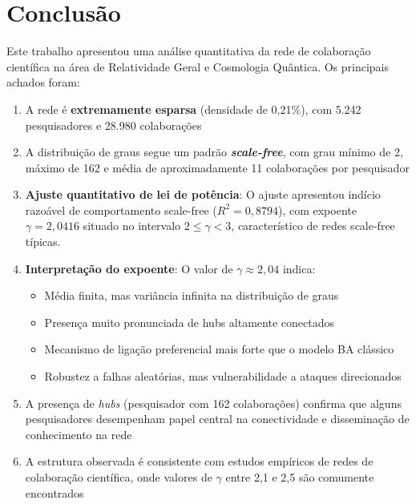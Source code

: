 \documentclass[12pt,a4paper]{article}
\begin{document}
\section{Conclusão}

Este trabalho apresentou uma análise quantitativa da rede de colaboração científica na área de Relatividade Geral e Cosmologia Quântica. Os principais achados foram:

\begin{enumerate}
    \item A rede é \textbf{extremamente esparsa} (densidade de 0,21\%), com 5.242 pesquisadores e 28.980 colaborações
    
    \item A distribuição de graus segue um padrão \textbf{\textit{scale-free}}, com grau mínimo de 2, máximo de 162 e média de aproximadamente 11 colaborações por pesquisador
    
    \item \textbf{Ajuste quantitativo de lei de potência}: O ajuste apresentou indício razoável de comportamento scale-free ($R^2 = 0,8794$), com expoente $\gamma = 2,0416$ situado no intervalo $2 \leq \gamma < 3$, característico de redes scale-free típicas.
    
    \item \textbf{Interpretação do expoente}: O valor de $\gamma \approx 2,04$ indica:
    \begin{itemize}
        \item Média finita, mas variância infinita na distribuição de graus
        \item Presença muito pronunciada de hubs altamente conectados
        \item Mecanismo de ligação preferencial mais forte que o modelo BA clássico
        \item Robustez a falhas aleatórias, mas vulnerabilidade a ataques direcionados
    \end{itemize}
    
    \item A presença de \textit{hubs} (pesquisador com 162 colaborações) confirma que alguns pesquisadores desempenham papel central na conectividade e disseminação de conhecimento na rede
    
    \item A estrutura observada é consistente com estudos empíricos de redes de colaboração científica, onde valores de $\gamma$ entre 2,1 e 2,5 são comumente encontrados
\end{enumerate}
\end{document}
